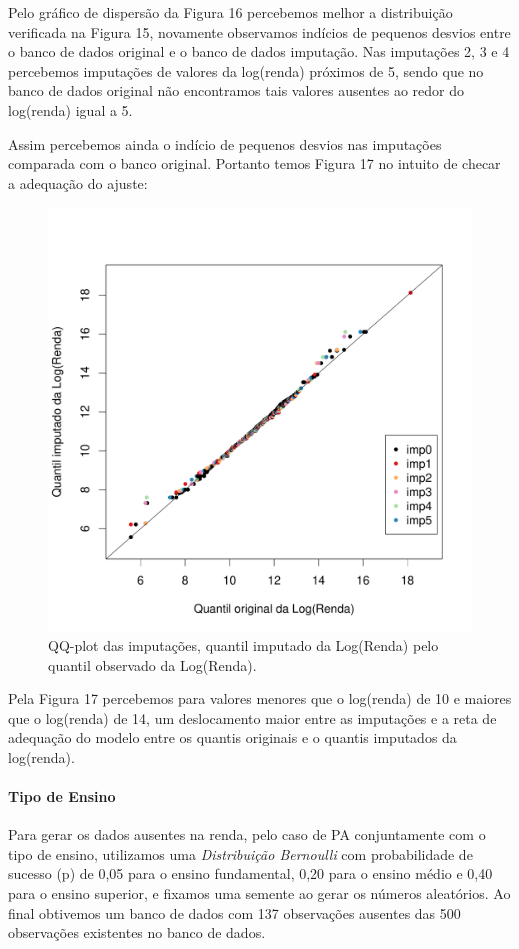 \documentclass[]{article}
\let\oldparagraph\paragraph
\renewcommand{\paragraph}[1]{\oldparagraph{#1}\mbox{}}
\begin{document}
Pelo gráfico de dispersão da Figura 16 percebemos melhor a distribuição
verificada na Figura 15, novamente observamos indícios de pequenos
desvios entre o banco de dados original e o banco de dados imputação.
Nas imputações 2, 3 e 4 percebemos imputações de valores da log(renda)
próximos de 5, sendo que no banco de dados original não encontramos tais
valores ausentes ao redor do log(renda) igual a 5.

Assim percebemos ainda o indício de pequenos desvios nas imputações
comparada com o banco original. Portanto temos Figura 17 no intuito de
checar a adequação do ajuste:

\begin{figure}[H]

{\centering \includegraphics[width=0.6\linewidth]{p48-graf} 

}

\caption{QQ-plot das imputações, quantil imputado da Log(Renda) pelo quantil observado da Log(Renda).}\label{fig:unnamed-chunk-25}
\end{figure}

Pela Figura 17 percebemos para valores menores que o log(renda) de 10 e
maiores que o log(renda) de 14, um deslocamento maior entre as
imputações e a reta de adequação do modelo entre os quantis originais e
o quantis imputados da log(renda).

\paragraph{Tipo de Ensino}\label{tipo-de-ensino}

Para gerar os dados ausentes na renda, pelo caso de PA conjuntamente com
o tipo de ensino, utilizamos uma \emph{Distribuição Bernoulli} com
probabilidade de sucesso (p) de 0,05 para o ensino fundamental, 0,20
para o ensino médio e 0,40 para o ensino superior, e fixamos uma semente
ao gerar os números aleatórios. Ao final obtivemos um banco de dados com
137 observações ausentes das 500 observações existentes no banco de
dados.
\end{document}
